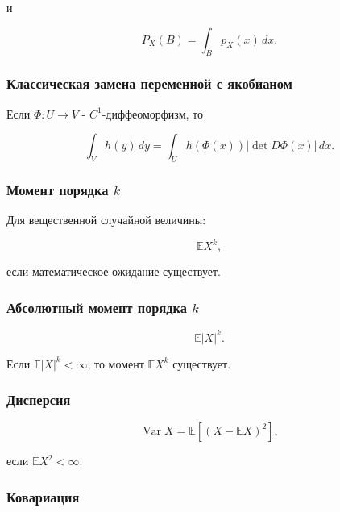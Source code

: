 \documentclass[
  11pt,
  a4paper,
]{article}
\begin{document}
и

\[
P_X(B)=\int_B p_X(x)\,dx.
\]

\subsubsection{Классическая замена переменной с
якобианом}\label{ux43aux43bux430ux441ux441ux438ux447ux435ux441ux43aux430ux44f-ux437ux430ux43cux435ux43dux430-ux43fux435ux440ux435ux43cux435ux43dux43dux43eux439-ux441-ux44fux43aux43eux431ux438ux430ux43dux43eux43c}

Если \(\Phi:U\to V\) - \(C^1\)-диффеоморфизм, то

\[
\int_V h(y)\,dy
=
\int_U h(\Phi(x))|\det D\Phi(x)|\,dx.
\]

\subsubsection{\texorpdfstring{Момент порядка
\(k\)}{Момент порядка k}}\label{ux43cux43eux43cux435ux43dux442-ux43fux43eux440ux44fux434ux43aux430-k}

Для вещественной случайной величины:

\[
\mathbb EX^k,
\]

если математическое ожидание существует.

\subsubsection{\texorpdfstring{Абсолютный момент порядка
\(k\)}{Абсолютный момент порядка k}}\label{ux430ux431ux441ux43eux43bux44eux442ux43dux44bux439-ux43cux43eux43cux435ux43dux442-ux43fux43eux440ux44fux434ux43aux430-k}

\[
\mathbb E|X|^k.
\]

Если \(\mathbb E|X|^k<\infty\), то момент \(\mathbb EX^k\) существует.

\subsubsection{Дисперсия}\label{ux434ux438ux441ux43fux435ux440ux441ux438ux44f}

\[
\operatorname{Var}X=\mathbb E[(X-\mathbb EX)^2],
\]

если \(\mathbb EX^2<\infty\).

\subsubsection{Ковариация}\label{ux43aux43eux432ux430ux440ux438ux430ux446ux438ux44f}
\end{document}
